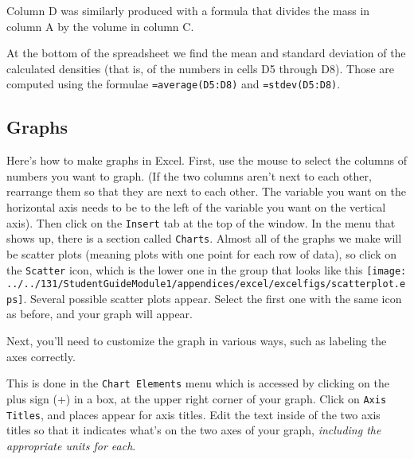 Column D was similarly produced with a formula that divides the
mass in column A by the volume in column C.

At the bottom of the spreadsheet we find the mean and standard
deviation of the calculated densities (that is, of the numbers
in cells D5 through D8).  Those are computed
using the formulae {\tt =average(D5:D8)} and {\tt =stdev(D5:D8)}.




\subsection{Graphs}

Here's how to make graphs in Excel.  First, use the mouse
to select the columns of numbers you want to graph.  (If the two
columns aren't next to each other, rearrange them so that they are next to 
each other. The variable you want on the horizontal axis needs to be to the 
left of the variable you want on the vertical axis).
Then click on the {\tt Insert} tab at the top of the window.
In the menu that shows up, there is a section called {\tt Charts}.
Almost all of the graphs we make will be scatter plots (meaning plots
with one point for each row of data), so click on the {\tt Scatter} icon, 
which is the lower one in the group that looks like this  
\texttt{[image: ../../131/StudentGuideModule1/appendices/excel/excelfigs/scatterplot.eps]}.  
Several possible scatter plots appear. Select the 
first one with the same icon as before, and your graph will appear.
\vspace{0.5cm}

Next, you'll need to customize the graph in various ways, such
as labeling the axes correctly.  
\vspace{0.5cm}

This is done in the {\tt Chart Elements} menu which is accessed by clicking 
on the plus sign (+) in a box, at the upper right corner of your graph. Click 
on {\tt Axis Titles}, and places appear for axis titles. Edit the text inside 
of the two axis titles so that it indicates what's on the two axes of your 
graph, {\it including the appropriate units for each}.
\vspace{0.5cm}

